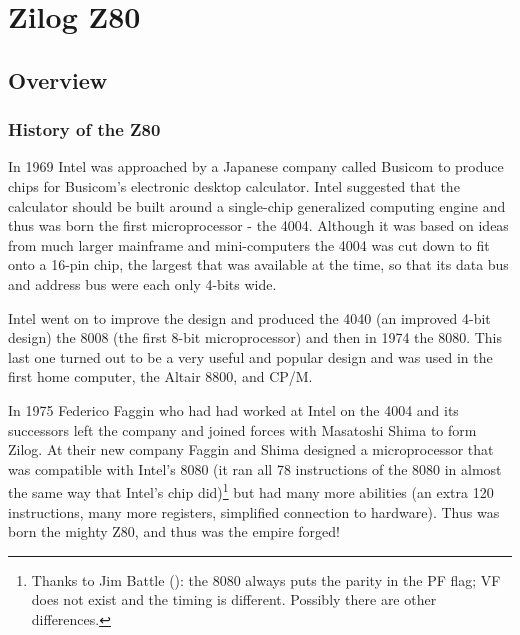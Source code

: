 \chapter{Zilog Z80}



\minitoc

\pagebreak
\section{Overview}
\subsection{History of the Z80}

In 1969 Intel was approached by a Japanese company called Busicom to produce  chips for Busicom's electronic desktop calculator. Intel suggested that the calculator should be built around a single-chip generalized computing engine and thus was born the first microprocessor - the 4004. Although it was based on ideas from much larger mainframe and mini-computers the 4004 was cut down to fit onto a 16-pin chip, the largest that was available at the time, so that its data bus and address bus were each only 4-bits wide. 

Intel went on to improve the design and produced the 4040 (an improved 4-bit design) the 8008 (the first 8-bit microprocessor) and then in 1974 the 8080. This last one turned out to be a very useful and popular design and was used in the first home computer, the Altair 8800, and CP/M. 

In 1975 Federico Faggin who had had worked at Intel on the 4004 and its successors left the company and joined forces with Masatoshi Shima to form Zilog. At their new company Faggin and Shima designed a microprocessor that was compatible with Intel's 8080 (it ran all 78 instructions of the 8080 in almost the same way that Intel's chip did)\footnote{Thanks to Jim Battle (): the 8080 always puts the parity in the PF flag; VF does not exist and the timing is different. Possibly there are other differences.} but had many more abilities (an extra 120 instructions, many more registers, simplified connection to hardware). Thus was born the mighty Z80, and thus was the empire forged!

